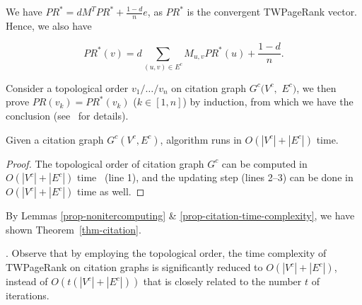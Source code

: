 {\begin{proofSketch}
We have $PR^* = d M^T PR^* + \frac{1-d}{n} e$, as $PR^*$ is the convergent TWPageRank vector. Hence, we also have
\begin{small}
\begin{equation}
PR^*(v)=d \sum_{(u,v)\in E^c} M_{u,v} PR^*(u) + \frac{1-d}{n}.
\end{equation}
\end{small}

\vspace{-1ex}
Consider a topological order $v_1/\dots/v_n$ on citation graph $G^c(V^c,$ $E^c)$, we then prove $PR(v_k)=PR^*(v_k)$ ($k\in[1,n]$) by induction, from which we have the conclusion (see~\cite {ERank-full} for details).
\end{proofSketch}


\begin{lemma}
\label{prop-citation-time-complexity}
Given a citation graph $G^c(V^c, E^c)$, algorithm \twprdag runs in $O(|V^c|+|E^c|)$ time.
\end{lemma}


\begin{proof}
The topological order of citation graph $G^c$ can be computed in  $O(|V^c|+|E^c|)$ time~\cite{CormenLRS01} (line 1), and the updating step (lines 2--3) can be done in $O(|V^c|+|E^c|)$ time as well.
\end{proof}




By Lemmas \ref{prop-nonitercomputing} \& \ref{prop-citation-time-complexity}, we have shown Theorem~\ref{thm-citation}.

. Observe that by employing the topological order, the time complexity of TWPageRank on citation graphs is significantly reduced to $O(|V^c|+|E^c|)$, instead of $O(t(|V^c|+|E^c|))$ that is closely related to the number $t$ of iterations.



}
